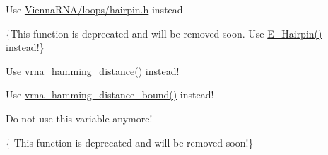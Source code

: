 \begin{DoxyRefList}
\item[\label{deprecated__deprecated000084}%
\Hypertarget{deprecated__deprecated000084}%
File \hyperlink{hairpin__loops_8h}{hairpin\+\_\+loops.h} ]Use \hyperlink{hairpin_8h}{Vienna\+R\+N\+A/loops/hairpin.\+h} instead  
\item[\label{deprecated__deprecated000077}%
\Hypertarget{deprecated__deprecated000077}%
Global \hyperlink{group__mfe__global__deprecated_gab327ce11972f5ac069d52c8dedfdb700}{HairpinE} (int size, int type, int si1, int sj1, const char $\ast$string)]\{This function is deprecated and will be removed soon. Use \hyperlink{group__eval__loops__hp_gadf943ee9a45b7f4cee9192c06210dace}{E\+\_\+\+Hairpin()} instead!\}  
\item[\label{deprecated__deprecated000180}%
\Hypertarget{deprecated__deprecated000180}%
Global \hyperlink{strings_8h_ad9dc7bfc9aa664dc6698f17ce07fc7e7}{hamming} (const char $\ast$s1, const char $\ast$s2)]Use \hyperlink{group__string__utils_ga301798b43b6f66687985c725efd14f32}{vrna\+\_\+hamming\+\_\+distance()} instead!  
\item[\label{deprecated__deprecated000181}%
\Hypertarget{deprecated__deprecated000181}%
Global \hyperlink{strings_8h_a96d3c36717d624514055ce201cab1542}{hamming\+\_\+bound} (const char $\ast$s1, const char $\ast$s2, int n)]Use \hyperlink{group__string__utils_ga5d1c2271e79d9bcb52d4e68360763fb9}{vrna\+\_\+hamming\+\_\+distance\+\_\+bound()} instead!  
\item[\label{deprecated__deprecated000083}%
\Hypertarget{deprecated__deprecated000083}%
Global \hyperlink{fold__vars_8h_a92089ae3a51b5d75a14ce9cc29cc8317}{iindx} ]Do not use this variable anymore!  
\item[\label{deprecated__deprecated000114}%
\Hypertarget{deprecated__deprecated000114}%
Global \hyperlink{group__part__func__global__deprecated_gaa12dda9dd6179cdd22bcce87c0682c07}{init\+\_\+co\+\_\+pf\+\_\+fold} (int length)]\{ This function is deprecated and will be removed soon!\}



\end{DoxyRefList}
